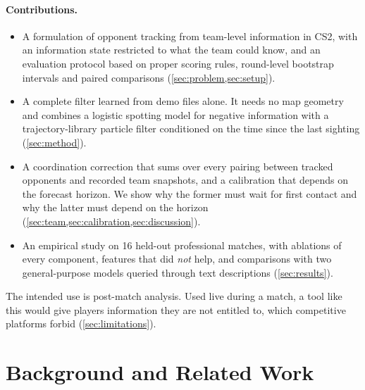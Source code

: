 \documentclass[11pt]{article}
\newcommand{\1}{\mathbb{1}}
\begin{document}
\paragraph{Contributions.}
\begin{itemize}
  \item A formulation of opponent tracking from team-level information in CS2, with an information state restricted to what the team could know, and an evaluation protocol based on proper scoring rules, round-level bootstrap intervals and paired comparisons (\cref{sec:problem,sec:setup}).
  \item A complete filter learned from demo files alone. It needs no map geometry and combines a logistic spotting model for negative information with a trajectory-library particle filter conditioned on the time since the last sighting (\cref{sec:method}).
  \item A coordination correction that sums over every pairing between tracked opponents and recorded team snapshots, and a calibration that depends on the forecast horizon. We show why the former must wait for first contact and why the latter must depend on the horizon (\cref{sec:team,sec:calibration,sec:discussion}).
  \item An empirical study on 16 held-out professional matches, with ablations of every component, features that did \emph{not} help, and comparisons with two general-purpose models queried through text descriptions (\cref{sec:results}).
\end{itemize}

The intended use is post-match analysis. Used live during a match, a tool like this would give players information they are not entitled to, which competitive platforms forbid (\cref{sec:limitations}).

\section{Background and Related Work}
\label{sec:background}
\end{document}
